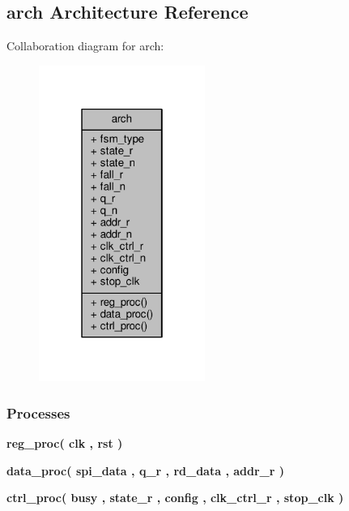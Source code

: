 \subsection{arch Architecture Reference}
\label{classconfig__ctrl_1_1arch}


Collaboration diagram for arch\+:\nopagebreak
\begin{figure}[H]
\begin{center}
\leavevmode
\includegraphics[width=154pt]{dd/dcd/classconfig__ctrl_1_1arch__coll__graph}
\end{center}
\end{figure}
\subsubsection*{Processes}
 \begin{DoxyCompactItemize}
\item 
{\bf reg\+\_\+proc}{\bfseries  ( {\bfseries {\bfseries {\bf clk}} \textcolor{vhdlchar}{ }} , {\bfseries {\bfseries {\bf rst}} \textcolor{vhdlchar}{ }} )}
\item 
{\bf data\+\_\+proc}{\bfseries  ( {\bfseries {\bfseries {\bf spi\+\_\+data}} \textcolor{vhdlchar}{ }} , {\bfseries {\bfseries {\bf q\+\_\+r}} \textcolor{vhdlchar}{ }} , {\bfseries {\bfseries {\bf rd\+\_\+data}} \textcolor{vhdlchar}{ }} , {\bfseries {\bfseries {\bf addr\+\_\+r}} \textcolor{vhdlchar}{ }} )}
\item 
{\bf ctrl\+\_\+proc}{\bfseries  ( {\bfseries {\bfseries {\bf busy}} \textcolor{vhdlchar}{ }} , {\bfseries {\bfseries {\bf state\+\_\+r}} \textcolor{vhdlchar}{ }} , {\bfseries {\bfseries {\bf config}} \textcolor{vhdlchar}{ }} , {\bfseries {\bfseries {\bf clk\+\_\+ctrl\+\_\+r}} \textcolor{vhdlchar}{ }} , {\bfseries {\bfseries {\bf stop\+\_\+clk}} \textcolor{vhdlchar}{ }} )}
\end{DoxyCompactItemize}
